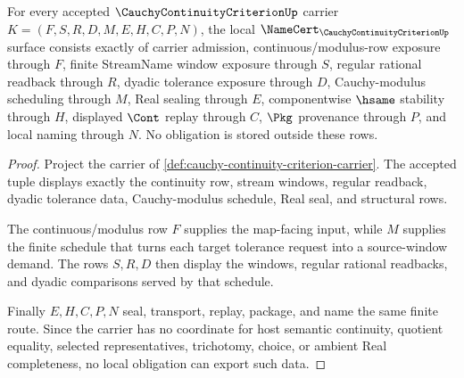 \begin{theorem}
\label{thm:cauchy-continuity-criterion-namecert-obligations}
For every accepted $\CauchyContinuityCriterionUp$ carrier $K=(F,S,R,D,M,E,H,C,P,N)$, the local $\NameCert_{\CauchyContinuityCriterionUp}$ surface consists exactly of carrier admission, continuous/modulus-row exposure through $F$, finite StreamName window exposure through $S$, regular rational readback through $R$, dyadic tolerance exposure through $D$, Cauchy-modulus scheduling through $M$, Real sealing through $E$, componentwise $\hsame$ stability through $H$, displayed $\Cont$ replay through $C$, $\Pkg$ provenance through $P$, and local naming through $N$. No obligation is stored outside these rows.
\end{theorem}
\begin{proof}
Project the carrier of \autoref{def:cauchy-continuity-criterion-carrier}. The accepted tuple displays exactly the continuity row, stream windows, regular readback, dyadic tolerance data, Cauchy-modulus schedule, Real seal, and structural rows.

The continuous/modulus row $F$ supplies the map-facing input, while $M$ supplies the finite schedule that turns each target tolerance request into a source-window demand. The rows $S,R,D$ then display the windows, regular rational readbacks, and dyadic comparisons served by that schedule.

Finally $E,H,C,P,N$ seal, transport, replay, package, and name the same finite route. Since the carrier has no coordinate for host semantic continuity, quotient equality, selected representatives, trichotomy, choice, or ambient Real completeness, no local obligation can export such data.
\end{proof}

